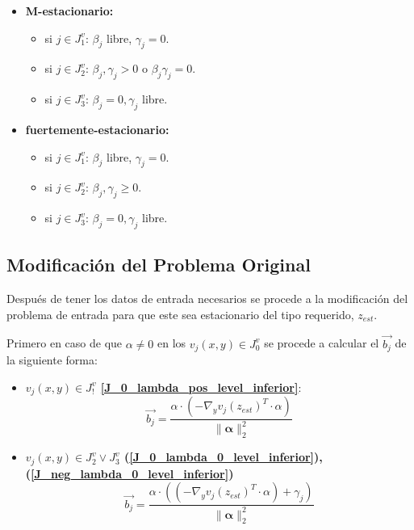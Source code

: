 \begin{itemize}
\item[]\begin{center} {\textbf{ M-estacionario:}} \end{center}\begin{itemize}\item si $j\in J_1^v$: $\beta_j$ libre, $\gamma_j=0$.\item si $j\in J_2^v$: $\beta_j,\gamma_j> 0$ o $\beta_j\gamma_j=0$.\item si $j\in J_3^v$: $\beta_j=0,\gamma_j$ libre.\end{itemize}
\item[]\begin{center} {\textbf{fuertemente-estacionario:}} \end{center}\begin{itemize}\item si $j\in J_1^v$: $\beta_j$ libre, $\gamma_j=0$.\item si $j\in J_2^v$: $\beta_j,\gamma_j\geq 0$.\item si $j\in J_3^v$: $\beta_j=0,\gamma_j$ libre.
\end{itemize}
\end{itemize}




\subsection{Modificación del Problema Original}
Después de tener los datos de entrada necesarios se procede a la modificación
del problema de entrada para que este sea estacionario del tipo requerido, $z_{est}$.

%
Primero en caso de que $\alpha \neq 0$ en los $v_j(x,y) \in J_0^v$ se procede a calcular el $\vec{b_j}$ de la siguiente forma:

\begin{itemize}
    \item \textbf{ $v_j(x,y) \in J_!^v$ \ref{J_0_lambda_pos_level_inferior}}:
        \begin{equation}
            \vec{b_j}=  \frac{{\alpha} \cdot (-\nabla_{y}{v_j(z_{est})}^T \cdot \alpha)}{\|\mathbf{\alpha} \|_2^2}
        \end{equation}
    \item \textbf{$v_j(x,y) \in J_2^v \lor J_3^v$ (\ref{J_0_lambda_0_level_inferior}), (\ref{J_neg_lambda_0_level_inferior})}\\
    \begin{equation}
        \vec{b_j}=  \frac{{\alpha} \cdot ((-\nabla_{y}{v_j(z_{est})}^T \cdot \alpha)+\gamma_j)}{\|\mathbf{\alpha} \|_2^2}
    \end{equation}
\end{itemize}

